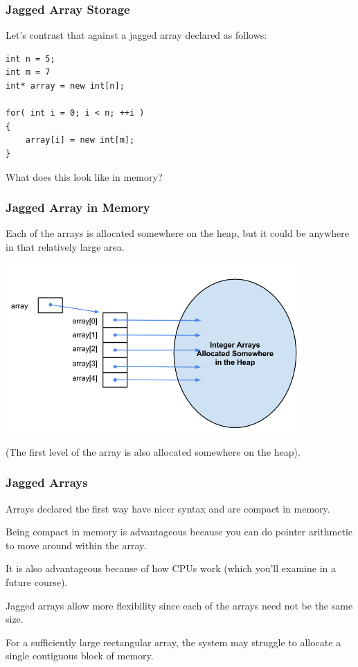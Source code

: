 \begin{frame}[fragile]
\frametitle{Jagged Array Storage}
Let's contrast that against a jagged array declared as follows:\\

\begin{verbatim}
int n = 5;
int m = 7
int* array = new int[n];

for( int i = 0; i < n; ++i )
{
    array[i] = new int[m];
}
\end{verbatim}

What does this look like in memory?

\end{frame}

\begin{frame}
\frametitle{Jagged Array in Memory}

Each of the arrays is allocated somewhere on the heap, but it could be anywhere in that relatively large area.

\begin{center}
	\includegraphics[width=0.85\textwidth]{images/jaggedArrayMemory.png}
\end{center}

(The first level of the array is also allocated somewhere on the heap).


\end{frame}

\begin{frame}
\frametitle{Jagged Arrays}

Arrays declared the first way have nicer syntax and are compact in memory.

Being compact in memory is advantageous because you can do pointer arithmetic to move around within the array.

It is also advantageous because of how CPUs work (which you'll examine in a future course).

Jagged arrays allow more flexibility since each of the arrays need not be the same size.

For a sufficiently large rectangular array, the system may struggle to allocate a single contiguous block of memory.

\end{frame}



